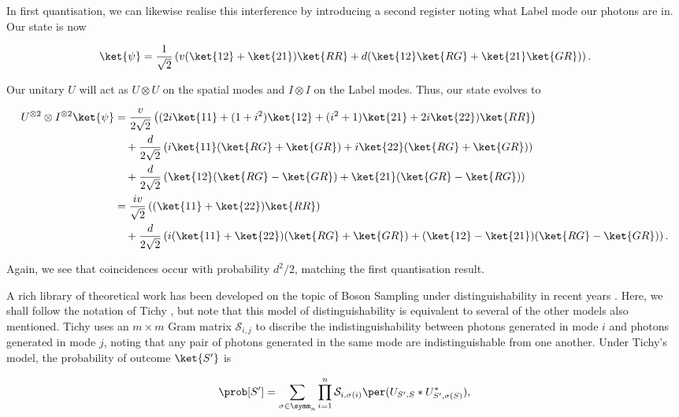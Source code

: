 In first quantisation, we can likewise realise this interference by introducing a second register noting what Label mode our photons are in. Our state is now

\begin{equation}
\ket{\psi} = \frac{1}{\sqrt{2}}\left(v(\ket{12}+\ket{21})\ket{RR}+d(\ket{12}\ket{RG} + \ket{21}\ket{GR})\right).
\end{equation}

Our unitary $U$ will act as $U\otimes U$ on the spatial modes and $I\otimes I$ on the Label modes. Thus, our state evolves to

\begin{align}
U^{\otimes 2}\otimes I^{\otimes 2}\ket{\psi} &= \frac{v}{2\sqrt{2}}\left((2i\ket{11}+(1+i^2)\ket{12}+(i^2+1)\ket{21}+2i\ket{22})\ket{RR}\right)\nonumber\\
&\quad+\frac{d}{2\sqrt{2}}\left(i\ket{11}(\ket{RG}+\ket{GR})+i\ket{22}(\ket{RG}+\ket{GR})\right)\nonumber\\
&\quad+\frac{d}{2\sqrt{2}}\left(\ket{12}(\ket{RG}-\ket{GR})+\ket{21}(\ket{GR}-\ket{RG})\right)\\
&= \frac{iv}{\sqrt{2}}\left((\ket{11}+\ket{22})\ket{RR}\right)\nonumber\\
&\quad+\frac{d}{2\sqrt{2}}\left(i(\ket{11}+\ket{22})(\ket{RG}+\ket{GR})+(\ket{12}-\ket{21})(\ket{RG}-\ket{GR})\right).
\end{align}

Again, we see that coincidences occur with probability $d^2/2$, matching the first quantisation result.

A rich library of theoretical work has been developed on the topic of Boson Sampling under distinguishability in recent years \cite{rohde2015, shchesnovich2015, tichy2015, tamma2016nonidentical, menssen2017}. Here, we shall follow the notation of Tichy \cite{tichy2015}, but note that this model of distinguishability is equivalent to several of the other models also mentioned. Tichy uses an $m\times m$ Gram matrix $\mathcal{S}_{i,j}$ to discribe the indistinguishability between photons generated in mode $i$ and photons generated in mode $j$, noting that any pair of photons generated in the same mode are indistinguishable from one another. Under Tichy's model, the probability of outcome $\ket{S'}$ is

\begin{equation}
\prob[S'] = \sum_{\sigma\in\symm_n}\prod_{i=1}^n\mathcal{S}_{i,\sigma(i)}\per(U_{S',S}*U_{S',\sigma(S)}^*),
\label{eqn:tichy-perm}
\end{equation}

